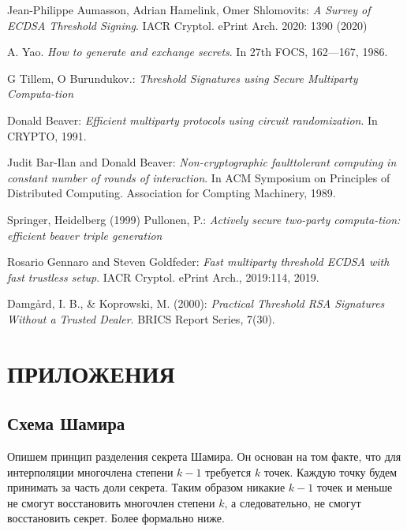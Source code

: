 \documentclass[a4paper,12pt]{article}
\theoremstyle{definition}
\begin{document}
	\newpage
	\renewcommand{\refname}{БИБЛИОГРАФИЧЕСКИЙ СПИСОК}
	\begin{thebibliography}{9}
		Jean-Philippe Aumasson, Adrian Hamelink, Omer Shlomovits: \emph{A Survey of ECDSA Threshold Signing}. IACR Cryptol. ePrint Arch. 2020: 1390 (2020) 
		
		A. Yao. \emph{How to generate and exchange secrets}. In 27th FOCS, 162—167, 1986.
	
		G Tillem, O Burundukov.: \emph{Threshold Signatures using Secure Multiparty Computa-tion}
		
		Donald Beaver: \emph{Efficient multiparty protocols using circuit randomization}. In CRYPTO, 1991.
		
		Judit Bar-Ilan and Donald Beaver: \emph{Non-cryptographic faulttolerant computing in constant number of rounds of interaction}. In ACM Symposium on Principles of Distributed Computing. Association for Compting Machinery, 1989. 
		
		Springer, Heidelberg (1999) Pullonen, P.: \emph{Actively secure two-party computa-tion: efficient beaver triple generation}
		
		Rosario Gennaro and Steven Goldfeder: \emph{Fast multiparty threshold ECDSA with fast trustless setup}. IACR Cryptol. ePrint Arch., 2019:114, 2019.
		
		Damgård, I. B., \& Koprowski, M. (2000): \emph{Practical Threshold RSA Signatures Without a Trusted Dealer}. BRICS Report Series, 7(30).
		
	\end{thebibliography}
	
	\newpage
	\section*{ПРИЛОЖЕНИЯ}
	
	\setcounter{subsection}{0}
	\renewcommand\thesubsection{\Alph{subsection}}

		\subsection{Схема Шамира} \label{applic:Shamir}
		
		Опишем принцип разделения секрета Шамира. Он основан на том факте, что для интерполяции многочлена степени $k-1$ требуется $k$ точек. Каждую точку будем принимать за часть доли секрета. Таким образом никакие $k-1$ точек и меньше не смогут восстановить многочлен степени $k$, а следовательно, не смогут восстановить секрет. Более формально ниже.
		
\end{document}
